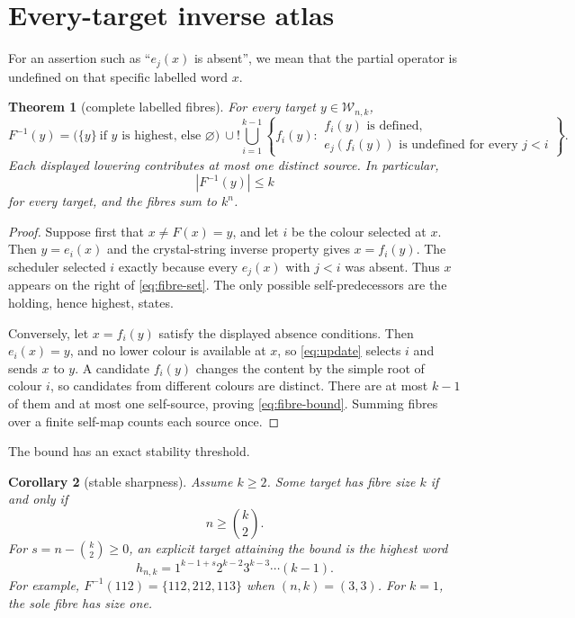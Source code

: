 \documentclass[a4paper,10pt]{amsart}
\newtheorem{theorem}{Theorem}[section]
\newtheorem{corollary}[theorem]{Corollary}
\theoremstyle{remark}
\newcommand{\Words}{\mathcal W}
\begin{document}
\section{Every-target inverse atlas}

For an assertion such as ``$e_j(x)$ is absent'', we mean that the partial
operator is undefined on that specific labelled word $x$.

\begin{theorem}[complete labelled fibres]\label{thm:fibre}
For every target $y\in\Words_{n,k}$,
\begin{equation}\label{eq:fibre-set}
 F^{-1}(y)=
 \bigl(\{y\}\ \text{if $y$ is highest, else }\varnothing\bigr)
 \ \cup\!!
 \bigcup_{i=1}^{k-1}
 \left\{
 f_i(y):
 \begin{array}{l}
 f_i(y)\text{ is defined},\\[-1mm]
 e_j(f_i(y))\text{ is undefined for every }j<i
 \end{array}
 \right\}.
\end{equation}
Each displayed lowering contributes at most one distinct source.  In
particular,
\begin{equation}\label{eq:fibre-bound}
 |F^{-1}(y)|\leq k
\end{equation}
for every target, and the fibres sum to $k^n$.
\end{theorem}

\begin{proof}
Suppose first that $x\neq F(x)=y$, and let $i$ be the colour selected at
$x$.  Then $y=e_i(x)$ and the crystal-string inverse property gives
$x=f_i(y)$.  The scheduler selected $i$ exactly because every $e_j(x)$ with
$j<i$ was absent.  Thus $x$ appears on the right of \eqref{eq:fibre-set}.
The only possible self-predecessors are the holding, hence highest, states.

Conversely, let $x=f_i(y)$ satisfy the displayed absence conditions.  Then
$e_i(x)=y$, and no lower colour is available at $x$, so \eqref{eq:update}
selects $i$ and sends $x$ to $y$.  A candidate $f_i(y)$ changes the content
by the simple root of colour $i$, so candidates from different colours are
distinct.  There are at most $k-1$ of them and at most one self-source,
proving \eqref{eq:fibre-bound}.  Summing fibres over a finite self-map counts
each source once.
\end{proof}

The bound has an exact stability threshold.

\begin{corollary}[stable sharpness]\label{cor:stable}
Assume $k\geq2$.  Some target has fibre size $k$ if and only if
\begin{equation}\label{eq:stable-threshold}
 n\geq\binom{k}{2}.
\end{equation}
For $s=n-\binom{k}{2}\geq0$, an explicit target attaining the bound is the
highest word
\begin{equation}\label{eq:staircase}
 h_{n,k}=1^{k-1+s}2^{k-2}3^{k-3}\cdots(k-1).
\end{equation}
For example, $F^{-1}(112)=\{112,212,113\}$ when $(n,k)=(3,3)$.
For $k=1$, the sole fibre has size one.
\end{corollary}
\end{document}
